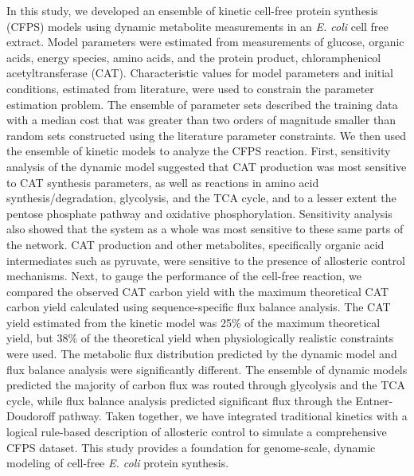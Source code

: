 \documentclass[12pt]{article}
\begin{document}
In this study, we developed an ensemble of kinetic cell-free protein synthesis (CFPS) models using dynamic metabolite measurements in an \textit{E. coli} cell free extract.
Model parameters were estimated from measurements of glucose, organic acids, energy species, amino acids, and the protein product, chloramphenicol acetyltransferase (CAT).
Characteristic values for model parameters and initial conditions, estimated from literature, were used to constrain the parameter estimation problem.
The ensemble of parameter sets described the training data with a median cost that was greater than two orders of magnitude smaller than random sets constructed using the literature parameter constraints. We then used the ensemble of kinetic models to analyze the CFPS reaction.
First, sensitivity analysis of the dynamic model suggested that CAT production was most sensitive to CAT synthesis parameters, as well as reactions in amino acid synthesis/degradation, glycolysis, and the TCA cycle, and to a lesser extent the pentose phosphate pathway and oxidative phosphorylation.
Sensitivity analysis also showed that the system as a whole was most sensitive to these same parts of the network.
CAT production and other metabolites, specifically organic acid intermediates such as pyruvate, were sensitive to the presence of allosteric control mechanisms.
Next, to gauge the performance of the cell-free reaction, we compared the observed CAT carbon yield with the maximum theoretical CAT carbon yield calculated using sequence-specific flux balance analysis. The CAT yield estimated from the kinetic model was 25\% of the maximum theoretical yield, but 38\% of the theoretical yield when physiologically realistic constraints were used. The metabolic flux distribution predicted by the dynamic model and flux balance analysis were significantly different.
The ensemble of dynamic models predicted the majority of carbon flux was routed through glycolysis and the TCA cycle, while flux balance analysis predicted significant flux through the Entner-Doudoroff pathway.
Taken together, we have integrated traditional kinetics with a logical rule-based description of allosteric control to simulate a comprehensive CFPS dataset.
This study provides a foundation for genome-scale, dynamic modeling of cell-free \textit{E. coli} protein synthesis.
\end{document}
